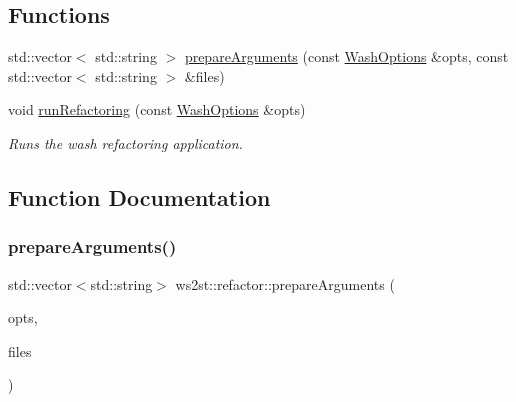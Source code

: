 \subsection*{Functions}
\begin{DoxyCompactItemize}
\item 
std\+::vector$<$ std\+::string $>$ \mbox{\hyperlink{namespacews2st_1_1refactor_ad2aa623558e939afddc247c8f8192c26}{prepare\+Arguments}} (const \mbox{\hyperlink{structWashOptions}{Wash\+Options}} \&opts, const std\+::vector$<$ std\+::string $>$ \&files)
\item 
void \mbox{\hyperlink{namespacews2st_1_1refactor_a06d0c091199ff73aac3a1131cc04842b}{run\+Refactoring}} (const \mbox{\hyperlink{structWashOptions}{Wash\+Options}} \&opts)
\begin{DoxyCompactList}\small\item\em Runs the wash refactoring application. \end{DoxyCompactList}\end{DoxyCompactItemize}


\subsection{Function Documentation}
\mbox{\label{namespacews2st_1_1refactor_ad2aa623558e939afddc247c8f8192c26}} 
\subsubsection{\texorpdfstring{prepare\+Arguments()}{prepareArguments()}}
{\footnotesize\ttfamily std\+::vector$<$std\+::string$>$ ws2st\+::refactor\+::prepare\+Arguments (\begin{DoxyParamCaption}\item[{const \mbox{\hyperlink{structWashOptions}{Wash\+Options}} \&}]{opts,  }\item[{const std\+::vector$<$ std\+::string $>$ \&}]{files }\end{DoxyParamCaption})}

\mbox{\label{namespacews2st_1_1refactor_a06d0c091199ff73aac3a1131cc04842b}} 
